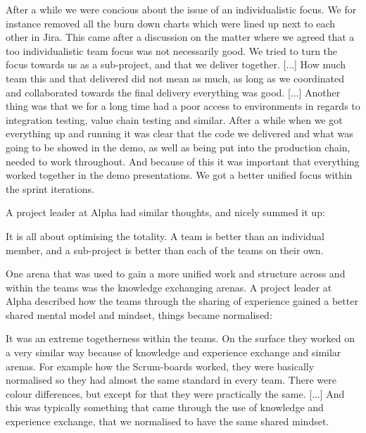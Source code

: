 \begin{fancyquotes}
After a while we were concious about the issue of an individualistic focus. We for instance removed all the burn down charts which were lined up next to each other in Jira. This came after a discussion on the matter where we agreed that a too individualistic team focus was not necessarily good. We tried to turn the focus towards us as a sub-project, and that we deliver together. [...] How much team this and that delivered did not mean as much, as long as we coordinated and collaborated towards the final delivery everything was good. [...] Another thing was that we for a long time had a poor access to environments in regards to integration testing, value chain testing and similar. After a while when we got everything up and running it was clear that the code we delivered and what was going to be showed in the demo, as well as being put into the production chain, needed to work throughout. And because of this it was important that everything worked together in the demo presentations. We got a better unified focus within the sprint iterations.
\end{fancyquotes}

A project leader at Alpha had similar thoughts, and nicely summed it up:

\begin{fancyquotes}
It is all about optimising the totality. A team is better than an individual member, and a sub-project is better than each of the teams on their own.
\end{fancyquotes}

One arena that was used to gain a more unified work and structure across and within the teams was the knowledge exchanging arenas. A project leader at Alpha described how the teams through the sharing of experience gained a better shared mental model and mindset, things became normalised:

\begin{fancyquotes}
It was an extreme togetherness within the teams. On the surface they worked on a very similar way because of knowledge and experience exchange and similar arenas. For example how the Scrum-boards worked, they were basically normalised so they had almost the same standard in every team. There were colour differences, but except for that they were practically the same. [...] And this was typically something that came through the use of knowledge and experience exchange, that we normalised to have the same shared mindset.
\end{fancyquotes}

